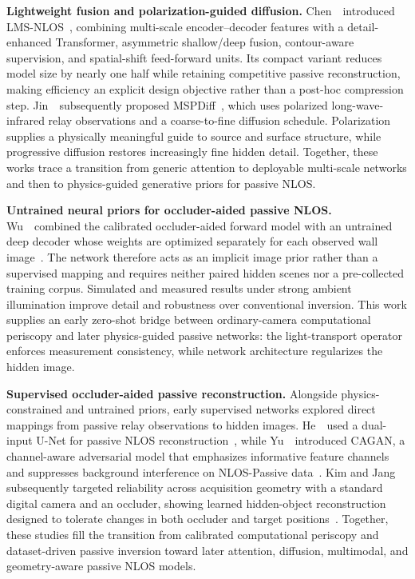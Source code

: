 \vspace{0.8mm}
\noindent \textbf{Lightweight fusion and polarization-guided diffusion.}
Chen~\etal~introduced LMS-NLOS~\cite{chenLightweightMultiScalePassiveNLOS2025}, combining multi-scale encoder--decoder features with a detail-enhanced Transformer, asymmetric shallow/deep fusion, contour-aware supervision, and spatial-shift feed-forward units. Its compact variant reduces model size by nearly one half while retaining competitive passive reconstruction, making efficiency an explicit design objective rather than a post-hoc compression step. Jin~\etal~subsequently proposed MSPDiff~\cite{jinMSPDiffPassiveNLOS2025}, which uses polarized long-wave-infrared relay observations and a coarse-to-fine diffusion schedule. Polarization supplies a physically meaningful guide to source and surface structure, while progressive diffusion restores increasingly fine hidden detail. Together, these works trace a transition from generic attention to deployable multi-scale networks and then to physics-guided generative priors for passive NLOS.

\vspace{0.8mm}
\vspace{0.8mm}
\noindent \textbf{Untrained neural priors for occluder-aided passive NLOS.}
Wu~\etal~combined the calibrated occluder-aided forward model with an untrained deep decoder whose weights are optimized separately for each observed wall image~\cite{wuUntrainedDeepDecoderNLOS2022}. The network therefore acts as an implicit image prior rather than a supervised mapping and requires neither paired hidden scenes nor a pre-collected training corpus. Simulated and measured results under strong ambient illumination improve detail and robustness over conventional inversion. This work supplies an early zero-shot bridge between ordinary-camera computational periscopy and later physics-guided passive networks: the light-transport operator enforces measurement consistency, while network architecture regularizes the hidden image.

\vspace{0.8mm}
\noindent \textbf{Supervised occluder-aided passive reconstruction.}
Alongside physics-constrained and untrained priors, early supervised networks explored direct mappings from passive relay observations to hidden images. He~\etal~used a dual-input U-Net for passive NLOS reconstruction~\cite{heDualInputUNetPNLOS2023}, while Yu~\etal~introduced CAGAN, a channel-aware adversarial model that emphasizes informative feature channels and suppresses background interference on NLOS-Passive data~\cite{yuCAGANPNLOS2023}. Kim and Jang subsequently targeted reliability across acquisition geometry with a standard digital camera and an occluder, showing learned hidden-object reconstruction designed to tolerate changes in both occluder and target positions~\cite{kimReliableOccluderPNLOS2024}. Together, these studies fill the transition from calibrated computational periscopy and dataset-driven passive inversion toward later attention, diffusion, multimodal, and geometry-aware passive NLOS models.

